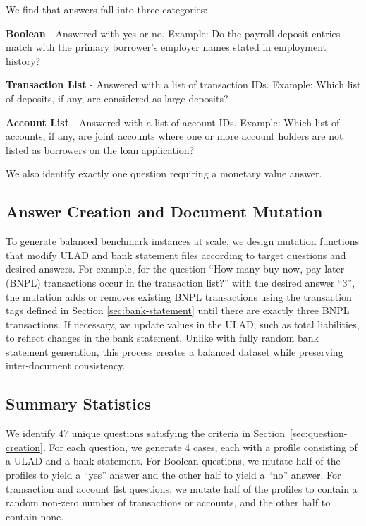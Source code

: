 \documentclass[11pt]{article}
\begin{document}
We find that answers fall into three categories:

\noindent \textbf{Boolean} - Answered with yes or no. Example: Do the payroll deposit entries match with the primary borrower's employer names stated in employment history?

\noindent \textbf{Transaction List} - Answered with a list of transaction IDs. Example: Which list of deposits, if any, are considered as large deposits?

\noindent \textbf{Account List} - Answered with a list of account IDs. Example: Which list of accounts, if any, are joint accounts where one or more account holders are not listed as borrowers on the loan application?

We also identify exactly one question requiring a monetary value answer.



\subsection{Answer Creation and Document Mutation}

To generate balanced benchmark instances at scale, we design mutation functions that modify ULAD and bank statement files according to target questions and desired answers.
For example, for the question ``How many buy now, pay later (BNPL) transactions occur in the transaction list?'' with the desired answer ``3'', the mutation adds or removes existing BNPL transactions using the transaction tags defined in Section \ref{sec:bank-statement} until there are exactly three BNPL transactions.
If necessary, we update values in the ULAD, such as total liabilities, to reflect changes in the bank statement.
Unlike with fully random bank statement generation, this process creates a balanced dataset while preserving inter-document consistency.

\subsection{Summary Statistics}

We identify 47 unique questions satisfying the criteria in Section~\ref{sec:question-creation}.
For each question, we generate 4 cases, each with a profile consisting of a ULAD and a bank statement.
For Boolean questions, we mutate half of the profiles to yield a ``yes'' answer and the other half to yield a ``no'' answer.
For transaction and account list questions, we mutate half of the profiles to contain a random non-zero number of transactions or accounts, and the other half to contain none.
\end{document}
